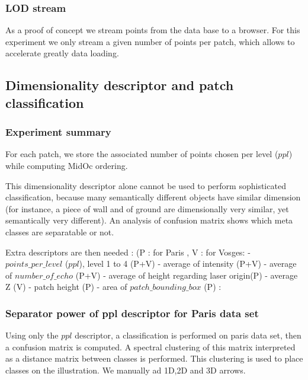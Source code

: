 				
		\subsubsection{LOD stream}
			As a proof of concept we stream points from the data base to a browser\cite{IGN2014a}.
			For this experiment we only stream a given number of points per patch, which allows to accelerate greatly data loading. 
			
	\subsection{Dimensionality descriptor and patch classification}
		\subsubsection{Experiment summary}
			For each patch, we store the associated number of points chosen per level ($ppl$) while computing MidOc ordering.  
			
			This dimensionality descriptor alone cannot be used to perform sophisticated classification, because many semantically different objects have similar dimension (for instance, a piece of wall and of ground are dimensionally very similar, yet semantically very different).
			An analysis of confusion matrix shows which meta classes are separatable or not.
			
			Extra descriptors are then needed :  (P : for Paris , V : for Vosges: 
			  - $points\_per\_level$ ($ppl$), level 1 to 4 (P+V)
			  - average of intensity (P+V)
			  - average of $number\_of\_echo$ (P+V)
			  - average of height regarding laser origin(P)
			  - average Z (V)
			  - patch height (P)
			  - area of $patch\_bounding\_box$ (P) : 
		
		\subsubsection{Separator power of ppl descriptor for Paris data set}
			
			
			Using only the $ppl$ descriptor, a classification is performed on paris data set, then a confusion matrix is computed.
			A spectral clustering of this matrix interpreted as a distance matrix between classes is performed. This clustering is used to place classes on the illustration.
			We manually ad 1D,2D and 3D arrows. 
		 
